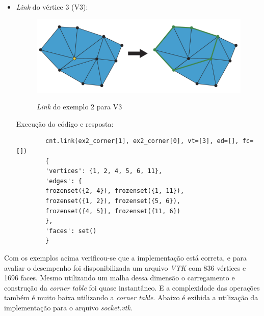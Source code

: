 \documentclass[a4paper]{article}
\begin{document}
\begin{itemize}
\begin{itemize}
		\item \textit{Link} do vértice 3 (V3):
		\begin{figure}[ht]
			\centering
			\includegraphics[width=1.0\textwidth]{link_ex2.png}
			\label{fig:link_ex2}
			\caption[caption]{\textit{Link} do exemplo 2 para V3}
		\end{figure}
		
		Execução do código e resposta:
		\begin{verbatim}
		cnt.link(ex2_corner[1], ex2_corner[0], vt=[3], ed=[], fc=[])
		{
		'vertices': {1, 2, 4, 5, 6, 11}, 
		'edges': {
		frozenset({2, 4}), frozenset({1, 11}), 
		frozenset({1, 2}), frozenset({5, 6}), 
		frozenset({4, 5}), frozenset({11, 6})
		}, 
		'faces': set()
		}
		\end{verbatim}
		
	\end{itemize}
\end{itemize}


Com os exemplos acima verificou-se que a implementação está correta, e para avaliar o desempenho foi disponibilizada um arquivo \textit{VTK} com 836 vértices e 1696 faces. Mesmo utilizando um malha dessa dimensão o carregamento e construção da \textit{corner table} foi quase instantâneo. E a complexidade das operações também é muito baixa utilizando a \textit{corner table}.
 Abaixo é exibida a utilização da implementação para o arquivo \textit{socket.vtk}.
\end{document}
